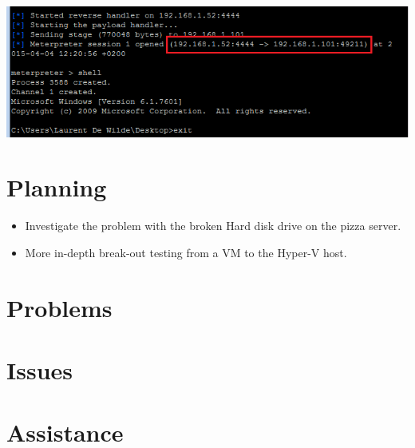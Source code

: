 \documentclass[11pt, a4paper]{article}
\begin{document}
\noindent\begin{minipage}{\textwidth}
    \centering
    \includegraphics[width=\textwidth]{Hack_2.png}
\end{minipage}


\section*{Planning}
\begin{itemize}
\item Investigate the problem with the broken Hard disk drive on the pizza server.
\item More in-depth break-out testing from a VM to the Hyper-V host.
\end{itemize}


\section*{Problems}



\section*{Issues}



\section*{Assistance}
\end{document}
